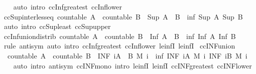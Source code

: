 \begin{isabellebody}
%
\isadelimproof
\ \ %
\endisadelimproof
%
\isatagproof
{}\isamarkupfalse%
\ {\isacharparenleft}auto\ intro{\isacharcolon}\ ccInf{\isacharunderscore}greatest\ ccInf{\isacharunderscore}lower{\isacharparenright}%
\endisatagproof
{\isafoldproof}%
%
\isadelimproof
\isanewline
%
\endisadelimproof
\isanewline
{}\isamarkupfalse%
\ ccSup{\isacharunderscore}inter{\isacharunderscore}less{\isacharunderscore}eq{\isacharcolon}\ {\isachardoublequoteopen}countable\ A\ {\isasymLongrightarrow}\ countable\ B\ {\isasymLongrightarrow}\ Sup\ {\isacharparenleft}A\ {\isasyminter}\ B{\isacharparenright}\ {\isasymle}\ inf\ {\isacharparenleft}Sup\ A{\isacharparenright}\ {\isacharparenleft}Sup\ B{\isacharparenright}{\isachardoublequoteclose}\isanewline
%
\isadelimproof
\ \ %
\endisadelimproof
%
\isatagproof
{}\isamarkupfalse%
\ {\isacharparenleft}auto\ intro{\isacharcolon}\ ccSup{\isacharunderscore}least\ ccSup{\isacharunderscore}upper{\isacharparenright}%
\endisatagproof
{\isafoldproof}%
%
\isadelimproof
\isanewline
%
\endisadelimproof
\isanewline
{}\isamarkupfalse%
\ ccInf{\isacharunderscore}union{\isacharunderscore}distrib{\isacharcolon}\ {\isachardoublequoteopen}countable\ A\ {\isasymLongrightarrow}\ countable\ B\ {\isasymLongrightarrow}\ Inf\ {\isacharparenleft}A\ {\isasymunion}\ B{\isacharparenright}\ {\isacharequal}\ inf\ {\isacharparenleft}Inf\ A{\isacharparenright}\ {\isacharparenleft}Inf\ B{\isacharparenright}{\isachardoublequoteclose}\isanewline
%
\isadelimproof
\ \ %
\endisadelimproof
%
\isatagproof
{}\isamarkupfalse%
\ {\isacharparenleft}rule\ antisym{\isacharparenright}\ {\isacharparenleft}auto\ intro{\isacharcolon}\ ccInf{\isacharunderscore}greatest\ ccInf{\isacharunderscore}lower\ le{\isacharunderscore}infI{}\ le{\isacharunderscore}infI{}{\isacharparenright}%
\endisatagproof
{\isafoldproof}%
%
\isadelimproof
\isanewline
%
\endisadelimproof
\isanewline
{}\isamarkupfalse%
\ ccINF{\isacharunderscore}union{\isacharcolon}\isanewline
\ \ {\isachardoublequoteopen}countable\ A\ {\isasymLongrightarrow}\ countable\ B\ {\isasymLongrightarrow}\ {\isacharparenleft}INF\ i{\isacharcolon}A\ {\isasymunion}\ B{\isachardot}\ M\ i{\isacharparenright}\ {\isacharequal}\ inf\ {\isacharparenleft}INF\ i{\isacharcolon}A{\isachardot}\ M\ i{\isacharparenright}\ {\isacharparenleft}INF\ i{\isacharcolon}B{\isachardot}\ M\ i{\isacharparenright}{\isachardoublequoteclose}\isanewline
%
\isadelimproof
\ \ %
\endisadelimproof
%
\isatagproof
{}\isamarkupfalse%
\ {\isacharparenleft}auto\ intro{\isacharbang}{\isacharcolon}\ antisym\ ccINF{\isacharunderscore}mono\ intro{\isacharcolon}\ le{\isacharunderscore}infI{}\ le{\isacharunderscore}infI{}\ ccINF{\isacharunderscore}greatest\ ccINF{\isacharunderscore}lower{\isacharparenright}%

\end{isabellebody}
